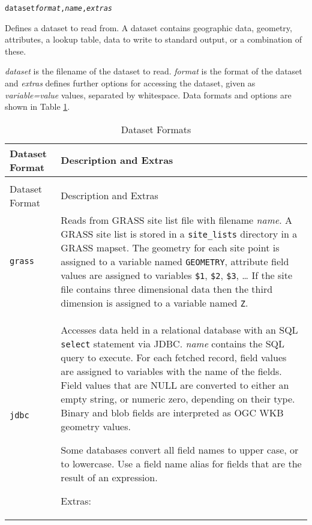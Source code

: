 \begin{alltt}
dataset \textit{format}, \textit{name}, \textit{extras}
\end{alltt}

Defines a dataset to read from.  A dataset contains geographic data,
geometry, attributes, a lookup table, data to write to standard
output, or a combination of these.

\textit{dataset} is the filename of the dataset to read.
\textit{format} is the format of the dataset and
\textit{extras} defines further options for accessing the dataset, given
as \textit{variable=value} values, separated by whitespace.
Data formats and options are shown in Table \ref{datasettypes}.


\begin{longtable}{|p{3cm}|p{10cm}|}
\hline
\label{datasettypes}
Dataset Format & Description and Extras \\
\hline
\hline
\endfirsthead
\hline
\caption{Dataset Formats} \\
\endfoot

\hline
Dataset Format & Description and Extras \\
\hline
\hline
\endhead

\texttt{grass} &
Reads from GRASS site list file with filename \textit{name}.
A GRASS site list is stored in a \texttt{site\_lists}
directory in a GRASS mapset.
The geometry for each site point is assigned to a variable named
\texttt{GEOMETRY}, attribute field values are assigned to variables
\texttt{\$1}, \texttt{\$2}, \texttt{\$3}, \dots
If the site file contains three dimensional data then the
third dimension is assigned to a variable named \texttt{Z}.  \\

\hline

\texttt{jdbc} &
Accesses data held in a relational database with
an SQL \texttt{select} statement via JDBC.
\textit{name} contains the SQL query to execute.
For each fetched record, field values are assigned to variables
with the name of the fields.
Field values that are NULL are converted to either an empty string,
or numeric zero, depending on their type.
Binary and blob fields are interpreted as OGC WKB geometry values.

Some databases convert all field names to upper case, or to lowercase.
Use a field name alias for fields that are the result of an expression.

\vspace{10pt}
Extras:


\end{longtable}
